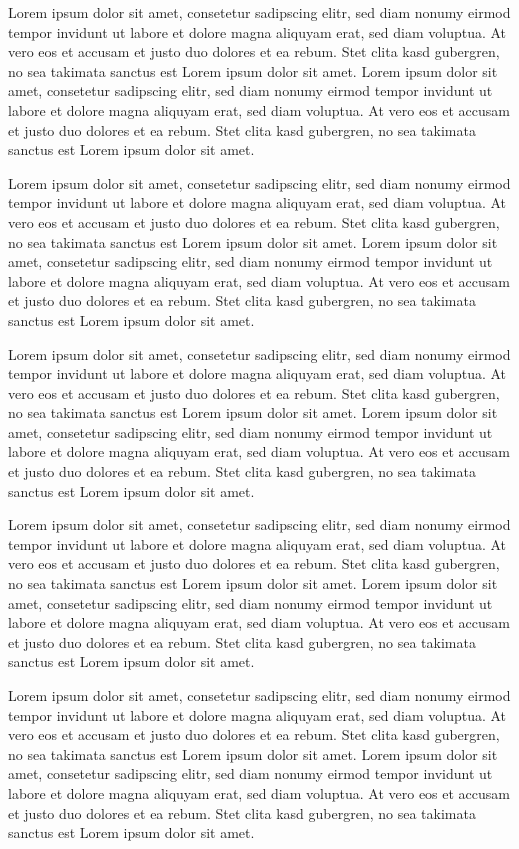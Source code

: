 Lorem ipsum dolor sit amet, consetetur sadipscing elitr, sed diam nonumy eirmod tempor invidunt ut labore et dolore magna aliquyam erat, sed diam voluptua. At vero eos et accusam et justo duo dolores et ea rebum. Stet clita kasd gubergren, no sea takimata sanctus est Lorem ipsum dolor sit amet. Lorem ipsum dolor sit amet, consetetur sadipscing elitr, sed diam nonumy eirmod tempor invidunt ut labore et dolore magna aliquyam erat, sed diam voluptua. At vero eos et accusam et justo duo dolores et ea rebum. Stet clita kasd gubergren, no sea takimata sanctus est Lorem ipsum dolor sit amet.

Lorem ipsum dolor sit amet, consetetur sadipscing elitr, sed diam nonumy eirmod tempor invidunt ut labore et dolore magna aliquyam erat, sed diam voluptua. At vero eos et accusam et justo duo dolores et ea rebum. Stet clita kasd gubergren, no sea takimata sanctus est Lorem ipsum dolor sit amet. Lorem ipsum dolor sit amet, consetetur sadipscing elitr, sed diam nonumy eirmod tempor invidunt ut labore et dolore magna aliquyam erat, sed diam voluptua. At vero eos et accusam et justo duo dolores et ea rebum. Stet clita kasd gubergren, no sea takimata sanctus est Lorem ipsum dolor sit amet.

Lorem ipsum dolor sit amet, consetetur sadipscing elitr, sed diam nonumy eirmod tempor invidunt ut labore et dolore magna aliquyam erat, sed diam voluptua. At vero eos et accusam et justo duo dolores et ea rebum. Stet clita kasd gubergren, no sea takimata sanctus est Lorem ipsum dolor sit amet. Lorem ipsum dolor sit amet, consetetur sadipscing elitr, sed diam nonumy eirmod tempor invidunt ut labore et dolore magna aliquyam erat, sed diam voluptua. At vero eos et accusam et justo duo dolores et ea rebum. Stet clita kasd gubergren, no sea takimata sanctus est Lorem ipsum dolor sit amet.

Lorem ipsum dolor sit amet, consetetur sadipscing elitr, sed diam nonumy eirmod tempor invidunt ut labore et dolore magna aliquyam erat, sed diam voluptua. At vero eos et accusam et justo duo dolores et ea rebum. Stet clita kasd gubergren, no sea takimata sanctus est Lorem ipsum dolor sit amet. Lorem ipsum dolor sit amet, consetetur sadipscing elitr, sed diam nonumy eirmod tempor invidunt ut labore et dolore magna aliquyam erat, sed diam voluptua. At vero eos et accusam et justo duo dolores et ea rebum. Stet clita kasd gubergren, no sea takimata sanctus est Lorem ipsum dolor sit amet.

Lorem ipsum dolor sit amet, consetetur sadipscing elitr, sed diam nonumy eirmod tempor invidunt ut labore et dolore magna aliquyam erat, sed diam voluptua. At vero eos et accusam et justo duo dolores et ea rebum. Stet clita kasd gubergren, no sea takimata sanctus est Lorem ipsum dolor sit amet. Lorem ipsum dolor sit amet, consetetur sadipscing elitr, sed diam nonumy eirmod tempor invidunt ut labore et dolore magna aliquyam erat, sed diam voluptua. At vero eos et accusam et justo duo dolores et ea rebum. Stet clita kasd gubergren, no sea takimata sanctus est Lorem ipsum dolor sit amet.

